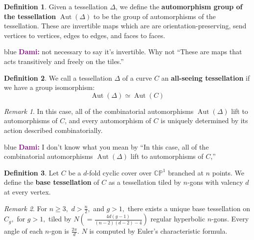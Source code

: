 \documentclass[12pt,reqno]{amsart}
\newenvironment{dami}{
  \medskip
\begin{color}{blue}
    \textcolor{purple}{\textbf{Dami:}} 
}{
\end{color}
  \medskip
}
\DeclareMathOperator{\Aut}{Aut}
\theoremstyle{definition}
\newtheorem{defn}{Definition}
\theoremstyle{remark}
\newtheorem*{remark}{Remark}
\begin{document}
\begin{defn} Given a tessellation $\Delta$, we define the \textbf{automorphism group of the tessellation} $\Aut(\Delta)$ to be the group of automorphisms of the tessellation. These are invertible maps which are are orientation-preserving, send vertices to vertices, edges to edges, and faces to faces. \end{defn} 

\begin{dami} not necessary to say it's invertible. Why not ``These are maps that acts transitively and freely on the tiles.''\end{dami}



\begin{defn} We call a tessellation $\Delta$ of a curve $C$ an \textbf{all-seeing tessellation} if we have a group isomorphism: $$\Aut(\Delta) \simeq \Aut(C)$$ 
\end{defn}

\begin{remark} In this case, all of the combinatorial automorphisms $\Aut(\Delta)$ lift to automorphisms of $C$, and every automorphism of $C$ is uniquely determined by its action described combinatorially.\end{remark}
\begin{dami} I don't know what you mean by ``In this case, all of the combinatorial automorphisms $\Aut(\Delta)$ lift to automorphisms of $C$,''\end{dami}

\begin{defn} \label{defn: base tess} Let $C$ be a $d$-fold cyclic cover over $\mathbb{C}\mathbb{P}^1$ branched at $n$ points. We define the \textbf{base tessellation} of $C$ as a tessellation tiled by $n$-gons with valency $d$ at every vertex. \end{defn}

\begin{remark} For $n \geq 3,$ $d > \frac{n}{2},$ and $g > 1,$ there exists a unique base tessellation on $C_g,$ for $g > 1,$ tiled by $N (= \frac{4 d (g - 1)}{(n - 2) (d - 2) - 4})$ regular hyperbolic $n$-gons. Every angle of each $n$-gon is $\frac{2 \pi}{d}.$ $N$ is computed by Euler's characteristic formula. \end{remark}
\end{document}
